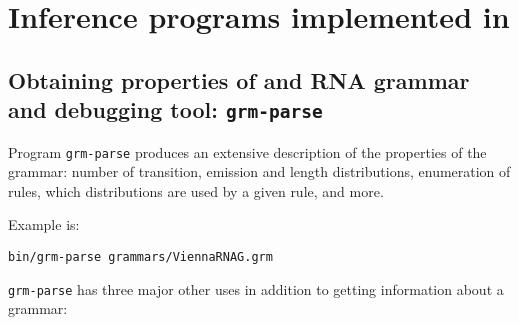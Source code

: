 \section{Inference programs implemented in \tornado}

\subsection{Obtaining properties of and RNA grammar and debugging tool: \texttt{grm-parse}}

Program \texttt{grm-parse} produces an extensive description of the
properties of the grammar: number of transition, emission and length
distributions, enumeration of rules, which distributions are used by a
given rule, and more.

Example is:\\

\begin{footnotesize}
 \texttt{bin/grm-parse grammars/ViennaRNAG.grm}\\
\end{footnotesize}

\texttt{grm-parse} has three major other uses in addition to getting
information about a grammar:

